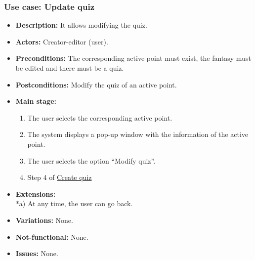\subsubsection{Use case: Update quiz}
\begin{itemize}
	\item \textbf{Description:} It allows modifying the quiz.
	\item \textbf{Actors:} Creator-editor (user).
	\item \textbf{Preconditions:} The corresponding active point must exist, the fantasy must be edited and there must be a quiz.
	\item \textbf{Postconditions:} Modify the quiz of an active point.
	\item \textbf{Main stage:}
	\begin{enumerate}
		\item The user selects the corresponding active point.
		\item The system displays a pop-up window with the information of the active point.
		\item The user selects the option ``Modify quiz''.
		\item Step 4 of \hyperlink{crearquiz} {Create quiz}
	\end{enumerate}
	\item \textbf{Extensions:} \\ *a) At any time, the user can go back.
	\item \textbf{Variations:} None.
	\item \textbf{Not-functional:} None.
	\item \textbf{Issues:} None.
\end{itemize}

